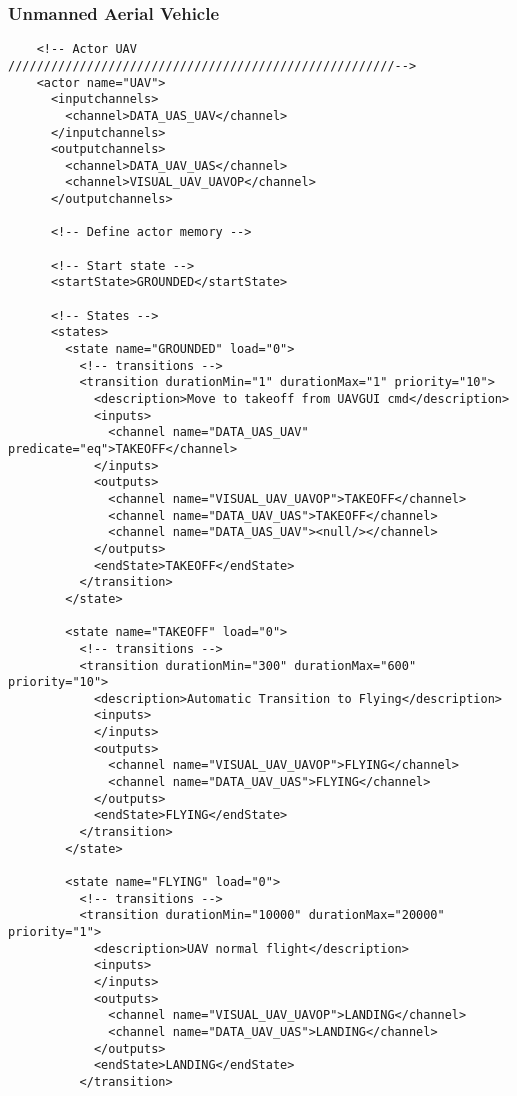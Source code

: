 \subsubsection{Unmanned Aerial Vehicle} 
\begin{verbatim}
    <!-- Actor UAV //////////////////////////////////////////////////////-->
    <actor name="UAV">
      <inputchannels>
        <channel>DATA_UAS_UAV</channel>
      </inputchannels>
      <outputchannels>
        <channel>DATA_UAV_UAS</channel>
        <channel>VISUAL_UAV_UAVOP</channel>
      </outputchannels>
      
      <!-- Define actor memory -->
      
      <!-- Start state -->
      <startState>GROUNDED</startState>
      
      <!-- States -->
      <states>
        <state name="GROUNDED" load="0">
          <!-- transitions -->
          <transition durationMin="1" durationMax="1" priority="10">
            <description>Move to takeoff from UAVGUI cmd</description>
            <inputs>
              <channel name="DATA_UAS_UAV" predicate="eq">TAKEOFF</channel>
            </inputs>
            <outputs>
              <channel name="VISUAL_UAV_UAVOP">TAKEOFF</channel>
              <channel name="DATA_UAV_UAS">TAKEOFF</channel>
              <channel name="DATA_UAS_UAV"><null/></channel>
            </outputs>
            <endState>TAKEOFF</endState>
          </transition>
        </state>
        
        <state name="TAKEOFF" load="0">
          <!-- transitions -->
          <transition durationMin="300" durationMax="600" priority="10">
            <description>Automatic Transition to Flying</description>
            <inputs>
            </inputs>
            <outputs>
              <channel name="VISUAL_UAV_UAVOP">FLYING</channel>
              <channel name="DATA_UAV_UAS">FLYING</channel>
            </outputs>
            <endState>FLYING</endState>
          </transition>
        </state>
        
        <state name="FLYING" load="0">
          <!-- transitions -->
          <transition durationMin="10000" durationMax="20000" priority="1">
            <description>UAV normal flight</description>
            <inputs>
            </inputs>
            <outputs>
              <channel name="VISUAL_UAV_UAVOP">LANDING</channel>
              <channel name="DATA_UAV_UAS">LANDING</channel>
            </outputs>
            <endState>LANDING</endState>
          </transition>
          

\end{verbatim}
